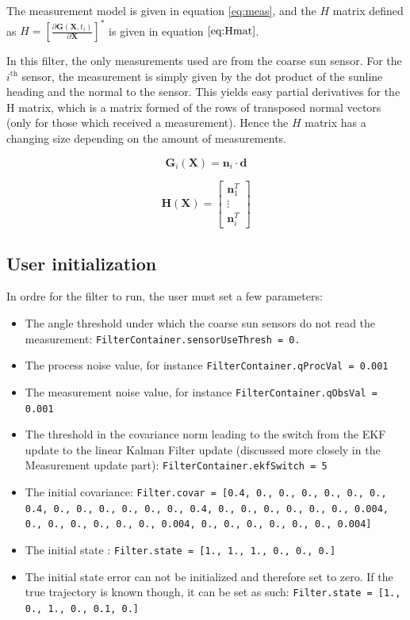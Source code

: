 \documentclass[]{BasiliskReportMemo}
\begin{document}
The measurement model is given in equation \ref{eq:meas}, and the $H$ matrix defined as $H = \left[\frac{\partial \bm G (\bm X, t_i)}{\partial \bm X}\right]^{*}$ is given in equation $\ref{eq:Hmat}$. 

In this filter, the only measurements used are from the coarse sun sensor. For the $i^\mathrm{th}$ sensor, the measurement is simply given by the dot product of the sunline heading and the normal to the sensor. This yields easy partial derivatives for the H matrix, which is a matrix formed of the rows of transposed normal vectors (only for those which received a measurement). Hence the $H$ matrix has a changing size depending on the amount of measurements. 

\begin{equation}\label{eq:meas}
\bm G_i(\bm X) = \bm n_i \cdot \bm d
\end{equation}

\begin{equation}\label{eq:Hmat}
\bm H(\bm X) = \begin{bmatrix} \bm n_1^T \\ \vdots \\ \bm n_i^T \end{bmatrix} 
\end{equation}

\subsection{User initialization}

In ordre for the filter to run, the user must set a few parameters:

\begin{itemize}
\item The angle threshold under which the coarse sun sensors do not read the measurement:  \texttt{FilterContainer.sensorUseThresh = 0.}
\item The process noise value, for instance \texttt{FilterContainer.qProcVal = 0.001}
\item The measurement noise value, for instance \texttt{FilterContainer.qObsVal = 0.001}
\item The threshold in the covariance norm leading to the switch from the EKF update to the linear Kalman Filter update (discussed more closely in the Measurement update part):
 \texttt{FilterContainer.ekfSwitch = 5}
\item The initial covariance: \texttt{Filter.covar = [0.4, 0., 0., 0., 0., 0., 0., 0.4, 0., 0., 0., 0., 0., 0., 0.4, 0., 0., 0., 0., 0., 0., 0.004, 0., 0., 0., 0., 0., 0., 0.004, 0., 0., 0., 0., 0., 0., 0.004]}
\item The initial state : \texttt{Filter.state = [1., 1., 1., 0., 0., 0.]}
\item The initial state error can not be initialized and therefore set to zero. If the true trajectory is known though, it can be set as such: \texttt{Filter.state = [1., 0., 1., 0., 0.1, 0.]}
\end{itemize}
\end{document}
